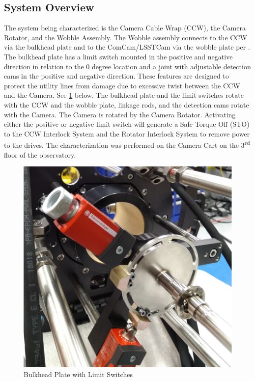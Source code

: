 \documentclass[SE,authoryear,toc, lsstdraft]{lsstdoc}
\begin{document}
\subsection{System Overview}

The system being characterized is the Camera Cable Wrap (CCW), the Camera Rotator,
and the Wobble Assembly. The Wobble assembly connects to the CCW via the bulkhead plate
and to the ComCam/LSSTCam via the wobble plate per . The bulkhead plate has a
limit switch mounted in the positive and negative direction in relation to the
0 degree location and a joint with adjustable detection cams in the positive
and negative direction. These features are designed to protect the utility lines
from damage due to excessive twist between the CCW and the Camera. See \ref{fig:Figure_1} below.
The bulkhead plate and the limit switches rotate with the CCW and the wobble plate,
linkage rods, and the detection cams rotate with the Camera. The Camera is rotated
by the Camera Rotator. Activating either the positive or negative limit switch will
generate a Safe Torque Off (STO) to the CCW Interlock System and the Rotator Interlock
System to remove power to the drives. The characterization was performed on the
Camera Cart on the 3\textsuperscript{rd} floor of the observatory.

\begin{figure}[h!]
  \includegraphics[width=\linewidth]{media/Figure_1.png}
  \caption{Bulkhead Plate with Limit Switches}
  \label{fig:Figure_1}
\end{figure}
\end{document}
